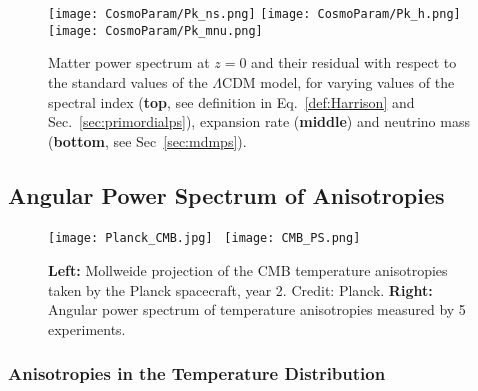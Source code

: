 \begin{figure}
\begin{center}
\texttt{[image: CosmoParam/Pk\_ns.png]}
\texttt{[image: CosmoParam/Pk\_h.png]}
\texttt{[image: CosmoParam/Pk\_mnu.png]}
\caption{Matter power spectrum at $z=0$ and their residual with respect to the standard values of the $\Lambda$CDM model, for varying values of the spectral index (\textbf{top}, see definition in Eq.~\ref{def:Harrison} and Sec.~\ref{sec:primordialps}), expansion rate (\textbf{middle}) and neutrino mass (\textbf{bottom}, see Sec~\ref{sec:mdmps}).}
\label{fig:Pk_cosmo}
\end{center}
\end{figure}


\subsection{Angular Power Spectrum of Anisotropies}

\begin{figure}[!]
\begin{center}
\texttt{[image: Planck\_CMB.jpg]}~%
\texttt{[image: CMB\_PS.png]}
\caption{\textbf{Left:} Mollweide projection of the CMB temperature anisotropies taken by the Planck spacecraft, year 2. Credit: Planck. \textbf{Right:} Angular power spectrum of temperature anisotropies measured by 5 experiments.}
\label{fig:CMB}
\end{center}
\end{figure}


\subsubsection{Anisotropies in the Temperature Distribution}


